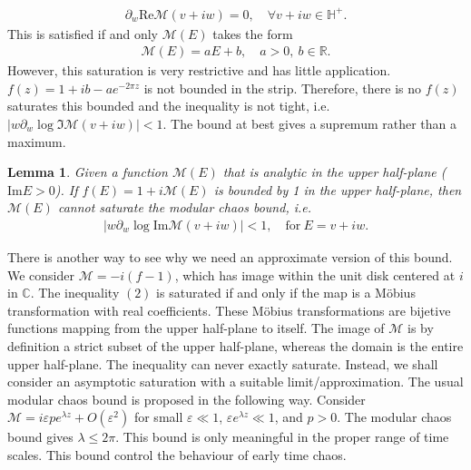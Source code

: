 \documentclass[a4paper,11pt]{article}
\newtheorem{lemma}[theorem]{Lemma}
\theoremstyle{definition}
\newcommand{\mM}{\mathcal{M}}
\newcommand{\p}{\partial}
\begin{document}
\begin{eqnarray}
    \p_w \text{Re} \mM(v+iw)=0, \quad \forall v+iw\in \mathbb{H}^+ .
\end{eqnarray}
This is satisfied if and only $\mM(E)$ takes the form
\begin{eqnarray}
    \mM(E)=a E+b, \quad a>0,\ b\in\mathbb{R}.
\end{eqnarray}
However, this saturation is very restrictive and has little application. $f(z) = 1+ib - a e^{-2\pi z}$ is not bounded in the strip. Therefore, there is no $f(z)$ saturates this bounded and the inequality is not tight, i.e. $|w\p_w \log \Im \mM(v+iw)| < 1$. The bound at best gives a supremum rather than a maximum.
\begin{lemma}
    Given a function $\mM(E)$ that is analytic in the upper half-plane ($\text{Im} E > 0$). If $f(E) = 1+i\mM(E)$ is bounded by 1 in the upper half-plane, then $\mM(E)$ cannot saturate the modular chaos bound, i.e.
    \begin{align}
        |w\p_w \log \text{Im} \mM(v+iw)| < 1, \quad \text{for}\ E=v+iw.
    \end{align}
\end{lemma}
There is another way to see why we need an approximate version of this bound. We consider $\mM = -i(f-1)$, which has image within the unit disk centered at $i$ in $\mathbb{C}$. The inequality $(2)$ is saturated if and only if the map is a M\"obius transformation with real coefficients. These M\"obius transformations are bijetive functions mapping from the upper half-plane to itself. The image of $\mM$ is by definition a strict subset of the upper half-plane, whereas the domain is the entire upper half-plane. The inequality can never exactly saturate. Instead, we shall consider an asymptotic saturation with a suitable limit/approximation. The usual modular chaos bound is proposed in the following way\cite{}. Consider $\mM = i\varepsilon p e^{\lambda z} + O(\varepsilon^2)$ for small $\varepsilon \ll 1$, $\varepsilon e^{\lambda z} \ll 1$, and $p>0$. The modular chaos bound gives $\lambda \leq 2\pi$. This bound is only meaningful in the proper range of time scales. This bound control the behaviour of early time chaos. 

\end{document}
